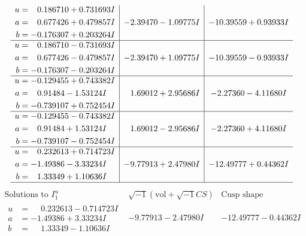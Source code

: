 \documentclass[1p]{elsarticle_modified}
\theoremstyle{definition}
\newcommand{\I}{\sqrt{-1}}
\begin{document}
$$\begin{array}{c|c|c}
\begin{aligned}
u &= \phantom{-}0.186710 + 0.731693 I \\
a &= \phantom{-}0.677426 + 0.479857 I \\
b &= -0.176307 + 0.203264 I\end{aligned}
 & -2.39470 - 1.09775 I & -10.39559 + 0.93933 I \\ \hline\begin{aligned}
u &= \phantom{-}0.186710 - 0.731693 I \\
a &= \phantom{-}0.677426 - 0.479857 I \\
b &= -0.176307 - 0.203264 I\end{aligned}
 & -2.39470 + 1.09775 I & -10.39559 - 0.93933 I \\ \hline\begin{aligned}
u &= -0.129455 + 0.743382 I \\
a &= \phantom{-}0.91484 - 1.53124 I \\
b &= -0.739107 + 0.752454 I\end{aligned}
 & \phantom{-}1.69012 + 2.95686 I & -2.27360 - 4.11680 I \\ \hline\begin{aligned}
u &= -0.129455 - 0.743382 I \\
a &= \phantom{-}0.91484 + 1.53124 I \\
b &= -0.739107 - 0.752454 I\end{aligned}
 & \phantom{-}1.69012 - 2.95686 I & -2.27360 + 4.11680 I \\ \hline\begin{aligned}
u &= \phantom{-}0.232613 + 0.714723 I \\
a &= -1.49386 - 3.33234 I \\
b &= \phantom{-}1.33349 + 1.10636 I\end{aligned}
 & -9.77913 + 2.47980 I & -12.49777 + 0.44362 I\\
 \hline 
 \end{array}$$\newpage$$\begin{array}{c|c|c}  
\text{Solutions to }I^u_{1}& \I (\text{vol} + \sqrt{-1}CS) & \text{Cusp shape}\\
 \hline 
\begin{aligned}
u &= \phantom{-}0.232613 - 0.714723 I \\
a &= -1.49386 + 3.33234 I \\
b &= \phantom{-}1.33349 - 1.10636 I\end{aligned}
 & -9.77913 - 2.47980 I & -12.49777 - 0.44362 I \\ \hline\begin{aligned}

\end{aligned}
\end{array}$$
\end{document}
